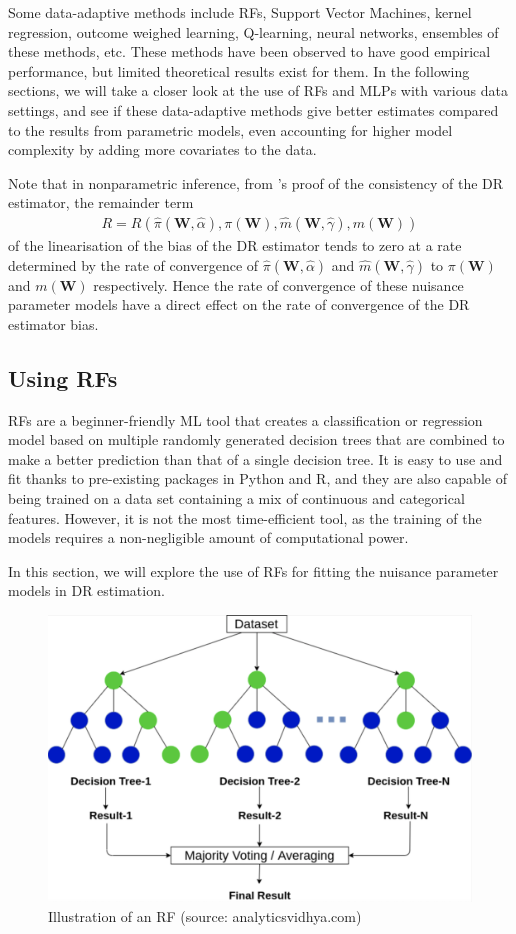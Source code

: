 \documentclass[12pt,twoside]{article}
\begin{document}
Some data-adaptive methods include RFs, Support Vector Machines, kernel regression, outcome weighed learning, Q-learning, neural networks, ensembles of these methods, etc. These methods have been observed to have good empirical performance, but limited theoretical results exist for them. In the following sections, we will take a closer look at the use of RFs and MLPs with various data settings, and see if these data-adaptive methods give better estimates compared to the results from parametric models, even accounting for higher model complexity by adding more covariates to the data.

Note that in nonparametric inference, from \cite{benkeser2017}'s proof of the consistency of the DR estimator, the remainder term 
\begin{align*}
R = R(\hat\pi(\mathbf{W},\hat{\alpha}), \pi(\mathbf{W}), \hat m(\mathbf{W}, \hat\gamma), m(\mathbf{W}))
\end{align*}
of the linearisation of the bias of the DR estimator tends to zero at a rate determined by the rate of convergence of  $\hat\pi(\mathbf{W},\hat{\alpha})$ and  $\hat m(\mathbf{W}, \hat\gamma)$ to $\pi(\mathbf{W})$ and $m(\mathbf{W})$ respectively. Hence the rate of convergence of these nuisance parameter models have a direct effect on the rate of convergence of the DR estimator bias.

\subsection{Using RFs}

RFs are a beginner-friendly ML tool that creates a classification or regression model based on multiple randomly generated decision trees that are combined to make a better prediction than that of a single decision tree. It is easy to use and fit thanks to pre-existing packages in Python and R, and they are also capable of being trained on a data set containing a mix of continuous and categorical features. However, it is not the most time-efficient tool, as the training of the models requires a non-negligible amount of computational power. 

In this section, we will explore the use of RFs for fitting the nuisance parameter models in DR estimation.

\begin{figure}
    \centering
    \includegraphics[width = 0.7\columnwidth]{figures/tree.png}
    \caption{Illustration of an RF (source: analyticsvidhya.com)}
    \label{fig:my_label}
\end{figure}
\end{document}
